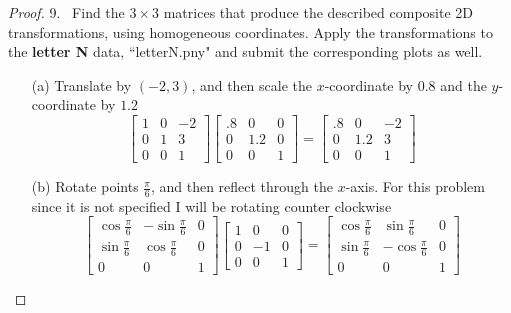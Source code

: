 \documentclass[12pt]{article}
\begin{document}
\begin{proof}
  9.~  Find the $ 3 \times 3$ matrices that produce the described composite 2D transformations, using homogeneous coordinates. Apply the transformations to the {\bf letter N} data, ``letterN.pny" and submit the corresponding plots as well.
  \begin{itemize}
  \item[(a)] Translate by $(-2, 3)$, and then scale the $x$-coordinate by $0.8$ and the $y$-coordinate by $1.2$
  \[

    \begin{bmatrix}
      1&0&-2\\
      0&1&3\\
      0&0&1
    \end{bmatrix}
      \begin{bmatrix}
        .8&0&0\\
        0&1.2&0\\
        0&0&1
      \end{bmatrix}=\begin{bmatrix}
        .8&0&-2\\
        0&1.2&3\\
        0&0&1
      \end{bmatrix}
  \]
  \item[(b)] Rotate points $\frac{\pi}{6}$, and then reflect through the $x$-axis.
  For this problem since it is not specified I will be rotating counter clockwise
  \[
  \renewcommand{\arraystretch}{2.5}
    \begin{bmatrix}
      \cos{\frac{\pi}{6}}&-\sin{\frac{\pi}{6}}&0\\
      \sin{\frac{\pi}{6}}& \cos{\frac{\pi}{6}}&0\\
      0&0&1
    \end{bmatrix}
    \begin{bmatrix}
    1&0&0\\
          0&-1&0\\
      0&0&1
    \end{bmatrix}=\begin{bmatrix}
      \cos{\frac{\pi}{6}}&\sin{\frac{\pi}{6}}&0\\
      \sin{\frac{\pi}{6}}& -\cos{\frac{\pi}{6}}&0\\
      0&0&1
    \end{bmatrix}
  \]
  \end{itemize}
\end{proof}
\end{document}
